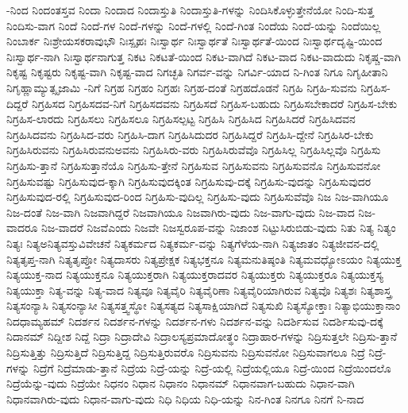 {-ನಿಂದ
ನಿಂದಂತಸ್ತವ
ನಿಂದಾ
ನಿಂದಾದ
ನಿಂದಾಸ್ತುತಿ
ನಿಂದಾಸ್ತುತಿ-ಗಳನ್ನು
ನಿಂದಿಸಿಕೊಳ್ಳುತ್ತೇನೆಯೋ
ನಿಂದಿ-ಸುತ್ತ
ನಿಂದಿಸು-ವಾಗ
ನಿಂದೆ
ನಿಂದೆ-ಗಳ
ನಿಂದೆ-ಗಳನ್ನು
ನಿಂದೆ-ಗಳಲ್ಲಿ
ನಿಂದೆ-ಗಿಂತ
ನಿಂದೆಯ
ನಿಂದೆ-ಯನ್ನು
ನಿಂದೆಯಿಲ್ಲ
ನಿಂಬಾರ್ಕ
ನಿಃಶ್ರೇಯಸಕರಾವುಭೌ
ನಿಃಸ್ಪೃಹಃ
ನಿಃಸ್ವಾರ್ಥ
ನಿಃಸ್ವಾರ್ಥತೆ
ನಿಃಸ್ವಾರ್ಥತೆ-ಯಿಂದ
ನಿಃಸ್ವಾರ್ಥದೃಷ್ಟಿ-ಯಿಂದ
ನಿಃಸ್ವಾರ್ಥ-ನಾಗಿ
ನಿಃಸ್ವಾರ್ಥನಾಗುತ್ತ
ನಿಕಟ
ನಿಕಟತೆ-ಯಿಂದ
ನಿಕಟ-ವಾಗಿದೆ
ನಿಕಟ-ವಾದ
ನಿಕಟ-ವಾದುದು
ನಿಕೃಷ್ಚ-ವಾಗಿ
ನಿಕೃಷ್ಟ
ನಿಕೃಷ್ಟರು
ನಿಕೃಷ್ಟ-ವಾಗಿ
ನಿಕೃಷ್ಟ-ವಾದ
ನಿಗಚ್ಛತಿ
ನಿಗರ್ವ-ವನ್ನು
ನಿಗರ್ವಿ-ಯಾದ
ನಿ-ಗಿಂತ
ನಿಗೂ
ನಿಗೃಹೀತಾನಿ
ನಿಗೃಹ್ಣಾಮ್ಯುತ್ಸೃಜಾಮಿ
-ನಿಗೆ
ನಿಗ್ರಹ
ನಿಗ್ರಹಂ
ನಿಗ್ರಹಃ
ನಿಗ್ರಹ-ದಂತೆ
ನಿಗ್ರಹದೊಡನೆ
ನಿಗ್ರಹಿ
ನಿಗ್ರಹಿ-ಸುವನು
ನಿಗ್ರಹಿಸ-ದಿದ್ದರೆ
ನಿಗ್ರಹಿಸದ
ನಿಗ್ರಹಿಸದವ-ನಿಗೆ
ನಿಗ್ರಹಿಸದವನು
ನಿಗ್ರಹಿಸದೆ
ನಿಗ್ರಹಿಸ-ಬಹುದು
ನಿಗ್ರಹಿಸಬೇಕಾದರೆ
ನಿಗ್ರಹಿಸ-ಬೇಕು
ನಿಗ್ರಹಿಸ-ಲಾರದು
ನಿಗ್ರಹಿಸಲು
ನಿಗ್ರಹಿಸಲೂ
ನಿಗ್ರಹಿಸಲ್ಪಟ್ಟ
ನಿಗ್ರಹಿಸಿ
ನಿಗ್ರಹಿಸಿದ
ನಿಗ್ರಹಿಸಿದರೆ
ನಿಗ್ರಹಿಸಿದವನ
ನಿಗ್ರಹಿಸಿದವನು
ನಿಗ್ರಹಿಸಿದ-ವರು
ನಿಗ್ರಹಿಸಿ-ದಾಗ
ನಿಗ್ರಹಿಸಿದುದರ
ನಿಗ್ರಹಿಸಿದ್ದರೆ
ನಿಗ್ರಹಿಸಿ-ದ್ದೇನೆ
ನಿಗ್ರಹಿಸಿರ-ಬೇಕು
ನಿಗ್ರಹಿಸಿರುವನು
ನಿಗ್ರಹಿಸಿರುವನುಅವನು
ನಿಗ್ರಹಿಸಿರು-ವರು
ನಿಗ್ರಹಿಸಿರುವೆವೊ
ನಿಗ್ರಹಿಸಿಲ್ಲ
ನಿಗ್ರಹಿಸಿಲ್ಲವೊ
ನಿಗ್ರಹಿಸು
ನಿಗ್ರಹಿಸು-ತ್ತಾನೆ
ನಿಗ್ರಹಿಸುತ್ತಾನೆಯೊ
ನಿಗ್ರಹಿಸು-ತ್ತೇನೆ
ನಿಗ್ರಹಿಸುವ
ನಿಗ್ರಹಿಸುವನು
ನಿಗ್ರಹಿಸುವನೊ
ನಿಗ್ರಹಿಸುವನೋ
ನಿಗ್ರಹಿಸುವಷ್ಟು
ನಿಗ್ರಹಿಸುವುದ-ಕ್ಕಾಗಿ
ನಿಗ್ರಹಿಸುವುದಕ್ಕಿಂತ
ನಿಗ್ರಹಿಸುವು-ದಕ್ಕೆ
ನಿಗ್ರಹಿಸು-ವುದನ್ನು
ನಿಗ್ರಹಿಸುವುದರ
ನಿಗ್ರಹಿಸುವುದ-ರಲ್ಲಿ
ನಿಗ್ರಹಿಸುವುದ-ರಿಂದ
ನಿಗ್ರಹಿಸು-ವುದಿಲ್ಲ
ನಿಗ್ರಹಿಸು-ವುದು
ನಿಗ್ರಹಿಸುವೆವೊ
ನಿಜ
ನಿಜ-ವಾಗಿಯೂ
ನಿಜ-ದಂತೆ
ನಿಜ-ವಾಗಿ
ನಿಜವಾಗಿದ್ದರೆ
ನಿಜವಾಗಿಯೂ
ನಿಜವಾಗಿರು-ವುದು
ನಿಜ-ವಾಗು-ವುದು
ನಿಜ-ವಾದ
ನಿಜ-ವಾದರೂ
ನಿಜ-ವಾದರೆ
ನಿಜವೆಎಂದು
ನಿಜವೇ
ನಿಜಸ್ವರೂಪ-ವನ್ನು
ನಿಜಾಂಶ
ನಿಟ್ಟುಸಿರುಬಿಡು-ವುದು
ನಿತು
ನಿತ್ಯ
ನಿತ್ಯಂ
ನಿತ್ಯಃ
ನಿತ್ಯಅನಿತ್ಯವಸ್ತುವಿವೇಚನೆ
ನಿತ್ಯಕರ್ಮದ
ನಿತ್ಯಕರ್ಮ-ವನ್ನು
ನಿತ್ಯಗೆಳೆಯ-ನಾಗಿ
ನಿತ್ಯಜಾತಂ
ನಿತ್ಯಜೀವನ-ದಲ್ಲಿ
ನಿತ್ಯತೃಪ್ತ-ನಾಗಿ
ನಿತ್ಯತೃಪ್ತೋ
ನಿತ್ಯದಾಸರು
ನಿತ್ಯಪ್ರೇಕ್ಷಕ
ನಿತ್ಯಭಕ್ತನೂ
ನಿತ್ಯಮನುತಿಷ್ಠಂತಿ
ನಿತ್ಯಮವಧ್ಯೋಽಯಂ
ನಿತ್ಯಯುಕ್ತ
ನಿತ್ಯಯುಕ್ತ-ನಾದ
ನಿತ್ಯಯುಕ್ತನೂ
ನಿತ್ಯಯುಕ್ತರಾಗಿ
ನಿತ್ಯಯುಕ್ತರಾದವರ
ನಿತ್ಯಯುಕ್ತರು
ನಿತ್ಯಯುಕ್ತರೂ
ನಿತ್ಯಯುಕ್ತಸ್ಯ
ನಿತ್ಯಯುಕ್ತಾ
ನಿತ್ಯ-ವನ್ನು
ನಿತ್ಯ-ವಾದ
ನಿತ್ಯವೂ
ನಿತ್ಯವೈರಿ
ನಿತ್ಯವೈರಿಣಾ
ನಿತ್ಯವೈರಿಯಾಗಿರುವ
ನಿತ್ಯವೊ
ನಿತ್ಯಶಃ
ನಿತ್ಯಶಾಸ್ತ್ರ
ನಿತ್ಯಸಂನ್ಯಾಸಿ
ನಿತ್ಯಸಂನ್ಯಾಸೀ
ನಿತ್ಯಸತ್ತ್ವಸ್ಥೋ
ನಿತ್ಯಸತ್ಯದ
ನಿತ್ಯಸಾಕ್ಷಿಯಾಗಿದೆ
ನಿತ್ಯಸುಖಿ
ನಿತ್ಯಸ್ಯೋಕ್ತಾಃ
ನಿತ್ಯಾಭಿಯುಕ್ತಾನಾಂ
ನಿದಧಾಮ್ಯಹಮ್
ನಿದರ್ಶನ
ನಿದರ್ಶನ-ಗಳನ್ನು
ನಿದರ್ಶನ-ಗಳು
ನಿದರ್ಶನ-ವನ್ನು
ನಿದರ್ಶಿಸುವ
ನಿದರ್ಶಿಸುವು-ದಕ್ಕೆ
ನಿದಾನಮ್
ನಿದ್ದೀಶ
ನಿದ್ದೆ
ನಿದ್ರಾ
ನಿದ್ರಾದೇವಿ
ನಿದ್ರಾಲಸ್ಯಪ್ರಮಾದೋತ್ಥಂ
ನಿದ್ರಾಹಾರ-ಗಳನ್ನು
ನಿದ್ರಿಸುತ್ತಲೇ
ನಿದ್ರಿಸು-ತ್ತಾನೆ
ನಿದ್ರಿಸುತ್ತಿತ್ತು
ನಿದ್ರಿಸುತ್ತಿದೆ
ನಿದ್ರಿಸುತ್ತಿದ್ದ
ನಿದ್ರಿಸುತ್ತಿರುವರೊ
ನಿದ್ರಿಸುವನು
ನಿದ್ರಿಸುವನೋ
ನಿದ್ರಿಸುವಾಗಲೂ
ನಿದ್ರೆ
ನಿದ್ರೆ-ಗಳನ್ನು
ನಿದ್ರೆಗೆ
ನಿದ್ರೆಮಾಡು-ತ್ತಾನೆ
ನಿದ್ರೆಯ
ನಿದ್ರೆ-ಯನ್ನು
ನಿದ್ರೆ-ಯಲ್ಲಿ
ನಿದ್ರೆಯಲ್ಲಿಯೂ
ನಿದ್ರೆ-ಯಿಂದ
ನಿದ್ರೆಯಿಂದಲೊ
ನಿದ್ರೆಯೆನ್ನು-ವುದು
ನಿದ್ರೆಯೇ
ನಿಧನಂ
ನಿಧಾನ
ನಿಧಾನಂ
ನಿಧಾನಮ್
ನಿಧಾನವಾಗ-ಬಹುದು
ನಿಧಾನ-ವಾಗಿ
ನಿಧಾನವಾಗಿರು-ವುದು
ನಿಧಾನ-ವಾಗು-ವುದು
ನಿಧಿ
ನಿಧಿಯ
ನಿಧಿ-ಯನ್ನು
ನಿನ-ಗಿಂತ
ನಿನಗೂ
ನಿನಗೆ
ನಿ-ನಾದ
}
